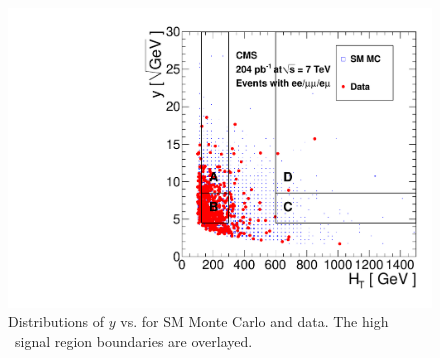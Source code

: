 \begin{figure}[tbh]
\begin{center}
\includegraphics[width=0.75\linewidth]{plots/abcd_204pb_highht.pdf}
\caption{\label{fig:abcdData3}\protect Distributions of $y$ 
vs. \Ht for SM Monte Carlo and data. The high \Ht\ signal region boundaries are overlayed.}
\end{center}
\end{figure}

